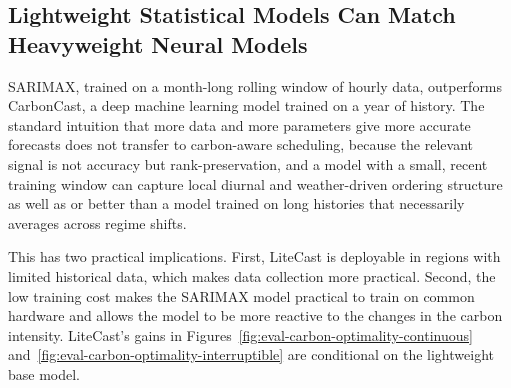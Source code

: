 \subsection{Lightweight Statistical Models Can Match Heavyweight Neural Models}
\label{sec:eval-discussion-lightweight}

SARIMAX, trained on a month-long rolling window of hourly data, outperforms CarbonCast, a deep machine learning model trained on a year of history.
The standard intuition that more data and more parameters give more accurate forecasts does not transfer to carbon-aware scheduling, because the relevant signal is not accuracy but rank-preservation, and a model with a small, recent training window can capture local diurnal and weather-driven ordering structure as well as or better than a model trained on long histories that necessarily averages across regime shifts.

This has two practical implications.
First, LiteCast is deployable in regions with limited historical data, which makes data collection more practical.
Second, the low training cost makes the SARIMAX model practical to train on common hardware and allows the model to be more reactive to the changes in the carbon intensity. 
LiteCast's gains in Figures~\ref{fig:eval-carbon-optimality-continuous} and~\ref{fig:eval-carbon-optimality-interruptible} are conditional on the lightweight base model.


